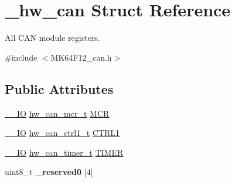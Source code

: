 \hypertarget{struct__hw__can}{}\section{\+\_\+hw\+\_\+can Struct Reference}
\label{struct__hw__can}


All C\+AN module registers.  




{\ttfamily \#include $<$M\+K64\+F12\+\_\+can.\+h$>$}

\subsection*{Public Attributes}
\begin{DoxyCompactItemize}
\item 
\hyperlink{core__sc300_8h_aec43007d9998a0a0e01faede4133d6be}{\+\_\+\+\_\+\+IO} \hyperlink{union__hw__can__mcr}{hw\+\_\+can\+\_\+mcr\+\_\+t} \hyperlink{struct__hw__can_ad345bf7f830189a8931ef7a35e3c4c84}{M\+CR}
\item 
\hyperlink{core__sc300_8h_aec43007d9998a0a0e01faede4133d6be}{\+\_\+\+\_\+\+IO} \hyperlink{union__hw__can__ctrl1}{hw\+\_\+can\+\_\+ctrl1\+\_\+t} \hyperlink{struct__hw__can_a56cf068b5255a3eafc149c71fe764b2e}{C\+T\+R\+L1}
\item 
\hyperlink{core__sc300_8h_aec43007d9998a0a0e01faede4133d6be}{\+\_\+\+\_\+\+IO} \hyperlink{union__hw__can__timer}{hw\+\_\+can\+\_\+timer\+\_\+t} \hyperlink{struct__hw__can_a6b9ebca85da0babbf3ce0612d69b4191}{T\+I\+M\+ER}
\item 
uint8\+\_\+t {\bfseries \+\_\+reserved0} \mbox{[}4\mbox{]}\hypertarget{struct__hw__can_a0e96a5a06d96ae49a7d8b92c2ec6627d}{}\label{struct__hw__can_a0e96a5a06d96ae49a7d8b92c2ec6627d}


\end{DoxyCompactItemize}
